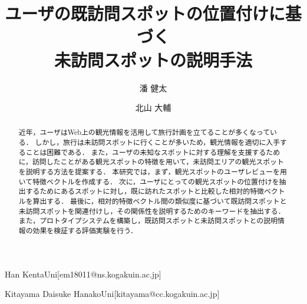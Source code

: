 \documentclass[submit,techrep,noauthor]{ipsj}
\begin{document}
\title{ユーザの既訪問スポットの位置付けに基づく\\未訪問スポットの説明手法}




\author{潘 健太}{Han Kenta}{Uni}[em18011@ns.kogakuin.ac.jp]
\author{北山 大輔}{Kitayama Daisuke Hanako}{Uni}[kitayama@cc.kogakuin.ac.jp]

\begin{abstract}
近年，ユーザはWeb上の観光情報を活用して旅行計画を立てることが多くなっている．
しかし，旅行は未訪問スポットに行くことが多いため，観光情報を適切に入手することは困難である．
また，ユーザの未知なスポットに対する理解を支援するために，訪問したことがある観光スポットの特徴を用いて，未訪問エリアの観光スポットを説明する方法を提案する．
本研究では，まず，観光スポットのユーザレビューを用いて特徴ベクトルを作成する．
次に，ユーザにとっての観光スポットの位置付けを抽出するためにあるスポットに対し，既に訪れたスポットと比較した相対的特徴ベクトルを算出する．
最後に，相対的特徴ベクトル間の類似度に基づいて既訪問スポットと未訪問スポットを関連付けし，その関係性を説明するためのキーワードを抽出する．
また，プロトタイプシステムを構築し，既訪問スポットと未訪問スポットとの説明情報の効果を検証する評価実験を行う．
\end{abstract}


%
%
%

\maketitle
\end{document}
